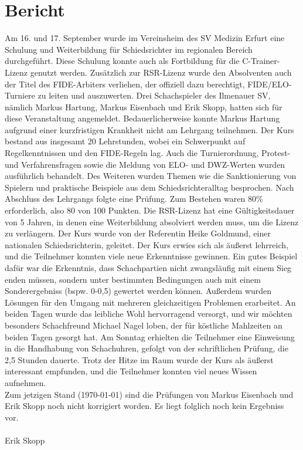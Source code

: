 \documentclass[a4paper,ngerman]{tui-algo-seminar}
\title{\content}
\author{Erik Skopp}
\newcommand{\content}{Regionaler-Schiedsrichter-Lehrgang des Thüringer Schachbundes im September 2023}
\begin{document}
\maketitle

\begin{abstract}
\content
\end{abstract}

\section{Bericht}
Am 16. und 17. September wurde im Vereinsheim des SV Medizin Erfurt eine Schulung und Weiterbildung für Schiedsrichter im regionalen Bereich durchgeführt. Diese Schulung konnte auch als Fortbildung für die C-Trainer-Lizenz genutzt werden. Zusätzlich zur RSR-Lizenz wurde den Absolventen auch der Titel des FIDE-Arbiters verliehen, der offiziell dazu berechtigt, FIDE/ELO-Turniere zu leiten und auszuwerten. Drei Schachspieler des Ilmenauer SV, nämlich Markus Hartung, Markus Eisenbach und Erik Skopp, hatten sich für diese Veranstaltung angemeldet. Bedauerlicherweise konnte Markus Hartung aufgrund einer kurzfristigen Krankheit nicht am Lehrgang teilnehmen.
Der Kurs bestand aus insgesamt 20 Lehrstunden, wobei ein Schwerpunkt auf Regelkenntnissen und den FIDE-Regeln lag. Auch die Turnierordnung, Protest- und Verfahrensfragen sowie die Meldung von ELO- und DWZ-Werten wurden ausführlich behandelt. Des Weiteren wurden Themen wie die Sanktionierung von Spielern und praktische Beispiele aus dem Schiedsrichteralltag besprochen.
Nach Abschluss des Lehrgangs folgte eine Prüfung. Zum Bestehen waren 80\% erforderlich, also 80 von 100 Punkten. Die RSR-Lizenz hat eine Gültigkeitsdauer von 5 Jahren, in denen eine Weiterbildung absolviert werden muss, um die Lizenz zu verlängern. Der Kurs wurde von der Referentin Heike Goldmund, einer nationalen Schiedsrichterin, geleitet.
Der Kurs erwies sich als äußerst lehrreich, und die Teilnehmer konnten viele neue Erkenntnisse gewinnen. Ein gutes Beispiel dafür war die Erkenntnis, dass Schachpartien nicht zwangsläufig mit einem Sieg enden müssen, sondern unter bestimmten Bedingungen auch mit einem Sonderergebniss (bspw. 0-0,5) gewertet werden können. Außerdem wurden Lösungen für den Umgang mit mehreren gleichzeitigen Problemen erarbeitet. An beiden Tagen wurde das leibliche Wohl hervorragend versorgt, und wir möchten besonders Schachfreund Michael Nagel loben, der für köstliche Mahlzeiten an beiden Tagen gesorgt hat.
Am Sonntag erhielten die Teilnehmer eine Einweisung in die Handhabung von Schachuhren, gefolgt von der schriftlichen Prüfung, die 2,5 Stunden dauerte. Trotz der Hitze im Raum wurde der Kurs als äußerst interessant empfunden, und die Teilnehmer konnten viel neues Wissen aufnehmen.\\
Zum jetzigen Stand (\today) sind die Prüfungen von Markus Eisenbach und Erik Skopp noch nicht korrigiert worden. Es liegt folglich noch kein Ergebniss vor.\\
\\
Erik Skopp
\end{document}
